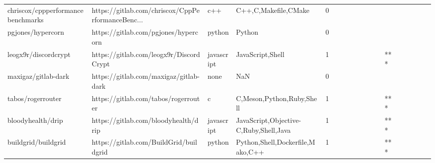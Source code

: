 \begin{tabular}{llllrlllllllllllll}
chriscox/cppperformancebenchmarks                  &  https://gitlab.com/chriscox/CppPerformanceBenc... &               c++ &                               C++,C,Makefile,CMake &       0 &         &        &           &                &                 &        &           &           &          &          &       &              &          \\
pgjones/hypercorn                                  &               https://gitlab.com/pgjones/hypercorn &            python &                                             Python &       0 &         &        &           &                &                 &        &           &           &          &          &       &              &          \\
leogx9r/discordcrypt                               &            https://gitlab.com/leogx9r/DiscordCrypt &        javascript &                                   JavaScript,Shell &       1 &         &        &           &                &                 &        &           &       *** &          &          &       &              &          \\
maxigaz/gitlab-dark                                &             https://gitlab.com/maxigaz/gitlab-dark &              none &                                                NaN &       0 &         &        &           &                &                 &        &           &           &          &          &       &              &          \\
tabos/rogerrouter                                  &               https://gitlab.com/tabos/rogerrouter &                 c &                          C,Meson,Python,Ruby,Shell &       1 &         &        &           &                &                 &        &           &       *** &          &          &       &              &          \\
bloodyhealth/drip                                  &               https://gitlab.com/bloodyhealth/drip &        javascript &             JavaScript,Objective-C,Ruby,Shell,Java &       1 &         &        &           &                &                 &        &           &       *** &          &          &       &              &          \\
buildgrid/buildgrid                                &             https://gitlab.com/BuildGrid/buildgrid &            python &                   Python,Shell,Dockerfile,Mako,C++ &       1 &         &        &           &                &                 &        &           &       *** &          &          &       &              &          \\

\end{tabular}
